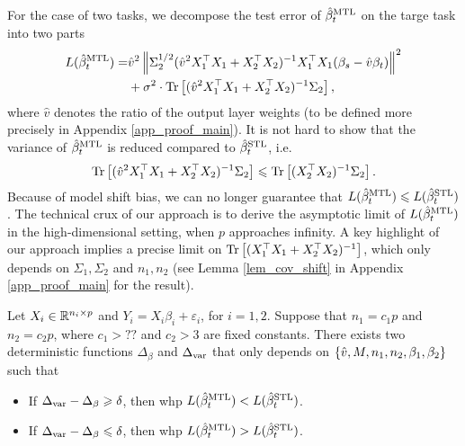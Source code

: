 For the case of two tasks, we decompose the test error of $\hat{\beta}_{t}^{\text{MTL}}$ on the targe task into two parts
\begin{align}
	L(\hat{\beta}_t^{\text{MTL}}) =& \hat{v}^2 \left\| \Sigma_2^{1/2} (\hat{v}^2 X_1^{\top}X_1 + X_2^{\top}X_2)^{-1}X_1^{\top}X_1 (\beta_s - \hat{v}\beta_t) \right\|^2 \nonumber \\
	&+ \sigma^2\cdot \operatorname{Tr}\left[(\hat{v}^2 X_1^{\top}X_1 + X_2^{\top}X_2)^{-1}\Sigma_2\right], \label{eq_te_model_shift}
\end{align}
where $\hat{v}$ denotes the ratio of the output layer weights (to be defined more precisely in Appendix \ref{app_proof_main}).
It is not hard to show that the variance of $\hat{\beta}_t^{\text{MTL}}$ is reduced compared to $\hat{\beta}_t^{\text{STL}}$, i.e. %
\[ \operatorname{Tr}\left[(\hat{v}^2 X_1^{\top}X_1 + X_2^{\top}X_2)^{-1}\Sigma_2\right] \leqslant \operatorname{Tr}\left[(X_2^{\top}X_2)^{-1}\Sigma_2\right]. \]
Because of model shift bias, we can no longer guarantee that $L(\hat{\beta}_{t}^{\text{MTL}}) \leqslant L(\hat{\beta}_t^{\text{STL}})$.
The technical crux of our approach is to derive the asymptotic limit of $L(\hat{\beta}_t^{\text{MTL}})$ in the high-dimensional setting, when $p$ approaches infinity.
A key highlight of our approach implies a precise limit on $\operatorname{Tr}\left[(X_1^{\top}X_1 + X_2^{\top}X_2)^{-1}\right]$, which only depends on $\Sigma_1, \Sigma_2$ and $n_1, n_2$ (see Lemma \ref{lem_cov_shift} in Appendix \ref{app_proof_main} for the result).

\begin{theorem}\label{thm_main_informal}
	Let $X_i \in\mathbb{R}^{n_i \times p}$ and $Y_i = X_i\beta_i + \varepsilon_i$, for $i = 1, 2$.
	Suppose that $n_1 = c_1 p$ and $n_2 = c_2 p$, where $c_1 > ??$ and $c_2 > 3$ are fixed constants.
	There exists two deterministic functions $\Delta_{\beta}$ and $\Delta_{\text{var}}$ that only depends on $\{\hat{v}, M, n_1, n_2, \beta_1, \beta_2\}$ such that
	\begin{itemize}
		\item If $\Delta_{\text{var}} - \Delta_{\beta} \geqslant \delta$, then whp $L(\hat{\beta}_t^{\text{MTL}}) < L(\hat{\beta}_t^{\text{STL}})$.
		\item If $\Delta_{\text{var}} - \Delta_{\beta} \leqslant \delta$, then whp $L(\hat{\beta}_t^{\text{MTL}}) > L(\hat{\beta}_t^{\text{STL}})$.
	\end{itemize}
\end{theorem}


